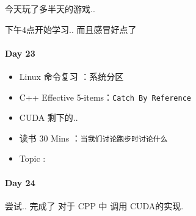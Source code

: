 \documentclass[UTF8,a4paper,8pt]{ctexart}
\begin{document}
	 	 今天玩了多半天的游戏..
	 	 
	 	 下午4点开始学习.. 而且感冒好点了
	 	 
 	 \paragraph{Day 23      \quad     }
 	 
	 	 \begin{itemize}[itemindent = 1em]
	 	 	\renewcommand\labelitemi{\makebox[0pt][l]{$\square$}\hspace{1em}} 
	 	 	\renewcommand\labelitemi{\makebox[0pt][l]{$\square$}\raisebox{.15ex}{\hspace{0.1em}$\checkmark$}}	 	
	 	 	\item   Linux 命令复习 ：系统分区
	 	 	\item   C++ Effective 5-items：\verb|Catch By Reference|
	 	 	\item   CUDA 剩下的..
	 	 	
	 	 	\item   读书  30 Mins	：\verb|当我们讨论跑步时讨论什么|	
	 	 	\renewcommand\labelitemi{\makebox[0pt][l]{$\square$}\hspace{1em}} 
	 	 	
	 	 	\renewcommand\labelitemi{\makebox[0pt][l]{$\square$}\raisebox{.15ex}{\hspace{0.1em}$\checkmark$}}
	 	 	\item   Topic : 
	 	 \end{itemize}
 	 \paragraph{Day 24      \quad     }
 	 
		 尝试.. 完成了 对于 CPP 中 调用 CUDA的实现.
		 
\end{document}
